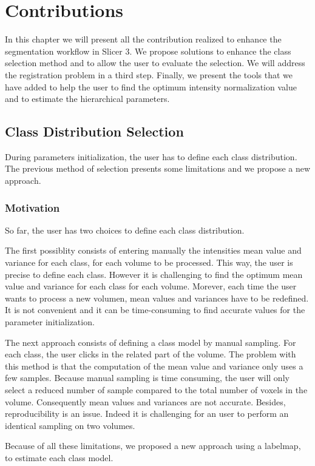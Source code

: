 \chapter{Contributions}\label{sec:contributions}
In this chapter we will present all the contribution realized to enhance the segmentation workflow in Slicer 3. 
We propose solutions to enhance the class selection method and to allow the user to evaluate the selection. We will address the registration problem in a third step. Finally, we present the tools that we have added to help the user to find the optimum intensity normalization value and to estimate the hierarchical parameters.
%
\section{Class Distribution Selection}\label{sec:CDS}
%
During parameters initialization, the user has to define each class distribution. The previous method of selection presents some limitations and we propose a new approach.
%
\subsection{Motivation}
%
So far, the user has two choices to define each class distribution. 
\par
The first possiblity consists of entering manually the intensities mean value and variance for each class, for each volume to be processed. This way, the user is precise to define each class. However it is challenging to find the optimum mean value and variance for each class for each volume. Morever, each time the user wants to process a new volumen, mean values and variances have to be redefined. It is not convenient and it can be time-consuming to find accurate values for the parameter initialization. 
\par
The next approach consists of defining a class model by manual sampling. For each class, the user clicks in the related part of the volume. The problem with this method is that the computation of the mean value and variance only uses a few samples. Because manual sampling is time consuming, the user will only select a reduced number of sample compared to the total number of voxels in the volume. Consequently mean values and variances are not accurate. Besides, reproducibility is an issue. Indeed it is challenging for an user to perform an identical sampling on two volumes.
\par
Because of all these limitations,  we proposed a new approach using a labelmap, to estimate each class model.
%

